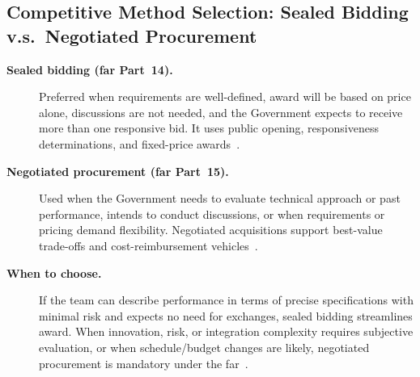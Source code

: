 \documentclass[../main.tex]{subfiles}
\begin{document}
\subsection{Competitive Method Selection: Sealed Bidding v.s.\ Negotiated Procurement}
\begin{description}
  \item[\textbf{Sealed bidding (\ac{far} Part~14).}] Preferred when requirements are well-defined, award will be based on price alone, discussions are not needed, and the Government expects to receive more than one responsive bid. It uses public opening, responsiveness determinations, and fixed-price awards~\autocite[Part~14]{FAR}.
  \item[\textbf{Negotiated procurement (\ac{far} Part~15).}] Used when the Government needs to evaluate technical approach or past performance, intends to conduct discussions, or when requirements or pricing demand flexibility. Negotiated acquisitions support best-value trade-offs and cost-reimbursement vehicles~\autocite[Part~15]{FAR}.
  \item[\textbf{When to choose.}] If the team can describe performance in terms of precise specifications with minimal risk and expects no need for exchanges, sealed bidding streamlines award. When innovation, risk, or integration complexity requires subjective evaluation, or when schedule/budget changes are likely, negotiated procurement is mandatory under the \ac{far}~\autocite{FAR,NAVSEA-Source-Selection-Guide-2022}.
\end{description}
\end{document}
